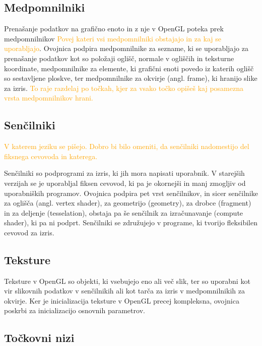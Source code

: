 \documentclass[a4paper, 12pt]{book}
\begin{document}
\subsection*{Medpomnilniki}

Prenašanje podatkov na grafično enoto in z nje v OpenGL poteka prek medpomnilnikov \textcolor{orange}{Povej kateri vsi medpomnilniki obstajajo in za kaj se uporabljajo}. Ovojnica podpira medpomnilnike za sezname, ki se uporabljajo za prenašanje podatkov kot so položaji oglišč, normale v ogliščih in teksturne koordinate, medpomnilnike za elemente, ki grafični enoti povedo iz katerih oglišč so sestavljene ploskve, ter medpomnilnike za okvirje (angl. frame), ki hranijo slike za izris. \textcolor{orange}{To raje razdelaj po točkah, kjer za vsako točko opišeš kaj posamezna vrsta medpomnilnikov hrani.}

\subsection*{Senčilniki}

\textcolor{orange}{V katerem jeziku se pišejo. Dobro bi bilo omeniti, da senčilniki nadomestijo del fiksnega cevovoda in katerega.}

Senčilniki so podprogrami za izris, ki jih mora napisati uporabnik. V starejših verzijah se je uporabljal fiksen cevovod, ki pa je okornejši in manj zmogljiv od uporabniških programov. Ovojnica podpira pet vrst senčilnikov, in sicer senčilnike za oglišča (angl. vertex shader), za geometrijo (geometry), za drobce (fragment) in za deljenje (tesselation), obstaja pa še senčilnik za izračunavanje (compute shader), ki pa ni podprt. Senčilniki se združujejo v programe, ki tvorijo fleksibilen cevovod za izris.

\subsection*{Teksture}

Teksture v OpenGL so objekti, ki vsebujejo eno ali več slik, ter so uporabni kot vir slikovnih podatkov v senčilnikih ali kot tarča za izris v medpomnilnikih za okvirje. Ker je inicializacija teksture v OpenGL precej kompleksna, ovojnica poskrbi za inicializacijo osnovnih parametrov.

\subsection*{Točkovni nizi}
\end{document}
